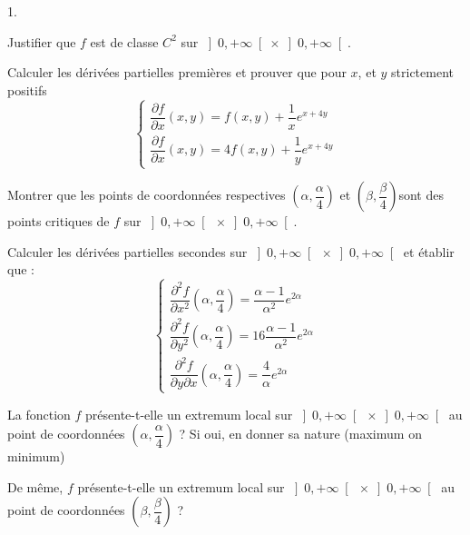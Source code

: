 \documentclass[11pt]{article}%
\begin{document}
\begin{noliste}{1.}
 \setlength{\itemsep}{4mm}
\item Justifier que $f$ est de classe $C^{2}$ sur $\left] 0, + \infty
\right[
\times \left] 0, + \infty \right[.$

\item Calculer les dérivées partielles premières et prouver que
pour $x$, et $y$ strictement positifs
\[
\left\{ 
\begin{array}{c}
\dfrac{\partial f}{\partial x}\left( x,y\right) = f\left( x,y\right) +
\dfrac{1}{x}e^{x + 4y} \\
\dfrac{\partial f}{\partial x}\left( x,y\right) = 4f\left( x,y\right) +
\dfrac{1}{y}e^{x + 4y}
\end{array}
\right. 
\]

\item Montrer que les points de coordonnées respectives $\left(
\alpha,\dfrac{\alpha }{4}\right) $ et $\left( \beta,\dfrac{\beta
}{4}\right) $sont
des points critiques de $f$ sur $\left] 0, + \infty \right[ \ \times
\left]
0, + \infty \right[.$

\item Calculer les dérivées partielles secondes sur $\left]
0, + \infty \right[ \ \times \left] 0, + \infty \right[ $ et établir
que :
\[
\left\{ 
\begin{array}{c}
\dfrac{\partial ^{2}f}{\partial x^{2}}\left( \alpha,\dfrac{\alpha
}{4}\right) = \dfrac{\alpha -1}{\alpha ^{2}}e^{2\alpha } \\
\dfrac{\partial ^{2}f}{\partial y^{2}}\left( \alpha,\dfrac{\alpha
}{4}\right) = 16\dfrac{\alpha -1}{\alpha ^{2}}e^{2\alpha } \\
\dfrac{\partial ^{2}f}{\partial y\partial x}\left( \alpha,\dfrac{\alpha
}{4}\right) = \dfrac{4}{\alpha }e^{2\alpha }
\end{array}
\right. 
\]

\item La fonction $f$ présente-t-elle un extremum local sur $\left]
0, + \infty \right[ \ \times \left] 0, + \infty \right[ $ au point de
coordonnées $\left( \alpha,\dfrac{\alpha }{4}\right) $ ? Si oui, en
donner sa nature
(maximum on minimum)

\item De même, $f$ présente-t-elle un extremum local sur $\left]
0, + \infty \right[ \ \times \left] 0, + \infty \right[ $ au point de
coordonnées $\left( \beta,\dfrac{\beta }{4}\right) $ ?
\end{noliste}
\end{document}
